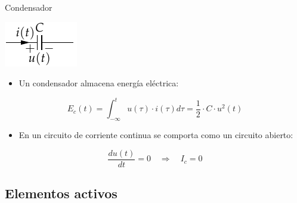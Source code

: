 \documentclass[aspectratio=169, xcolor={usenames,svgnames,dvipsnames}]{beamer}
\begin{document}

\begin{frame}{Condensador}
    \begin{center}
    \includegraphics[height=0.2\textheight]{../figs/Condensador.pdf}
    \end{center}
    
    \begin{itemize}
    \item Un condensador almacena \alert{energía eléctrica}:
    \end{itemize}
    \[
      E_c(t) = \int_{-\infty}^t u(\tau) \cdot i(\tau) d\tau = \boxed{ \frac{1}{2} \cdot C \cdot u^2(t) }
    \]
    
    \begin{itemize}
    \item En un circuito de corriente continua se comporta como un \alert{circuito abierto}:
    \end{itemize}
    \begin{equation*}
      \frac{du(t)}{dt} = 0 \quad \Rightarrow \quad I_c = 0
    \end{equation*}
\end{frame}


\subsection{Elementos activos}
\end{document}
